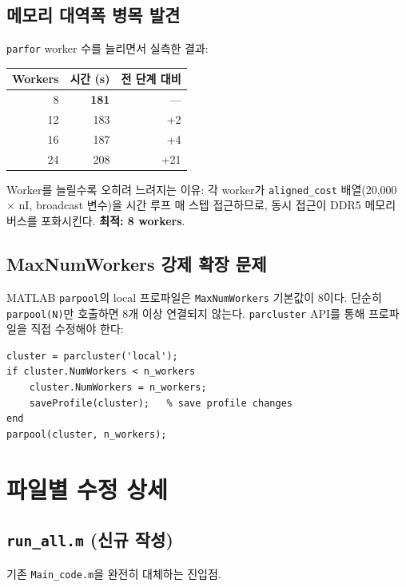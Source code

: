 \documentclass[11pt, a4paper]{article}
\begin{document}
\subsection{메모리 대역폭 병목 발견}

\texttt{parfor} worker 수를 늘리면서 실측한 결과:

\begin{center}
\begin{tabular}{rrr}
\toprule
Workers & 시간 (s) & 전 단계 대비 \\
\midrule
8  & \textbf{181} & --- \\
12 & 183 & +2 \\
16 & 187 & +4 \\
24 & 208 & +21 \\
\bottomrule
\end{tabular}
\end{center}

Worker를 늘릴수록 오히려 느려지는 이유:
각 worker가 \texttt{aligned\_cost} 배열(20,000 $\times$ nI, broadcast 변수)을
시간 루프 매 스텝 접근하므로, 동시 접근이 DDR5 메모리 버스를 포화시킨다.
\textbf{최적: 8 workers}.

\subsection{MaxNumWorkers 강제 확장 문제}

MATLAB \texttt{parpool}의 local 프로파일은 \texttt{MaxNumWorkers} 기본값이 8이다.
단순히 \texttt{parpool(N)}만 호출하면 8개 이상 연결되지 않는다.
\texttt{parcluster} API를 통해 프로파일을 직접 수정해야 한다:

\begin{lstlisting}
cluster = parcluster('local');
if cluster.NumWorkers < n_workers
    cluster.NumWorkers = n_workers;
    saveProfile(cluster);   % save profile changes
end
parpool(cluster, n_workers);
\end{lstlisting}

\section{파일별 수정 상세}

\subsection{\texttt{run\_all.m} (신규 작성)}

기존 \texttt{Main\_code.m}을 완전히 대체하는 진입점.
\end{document}
